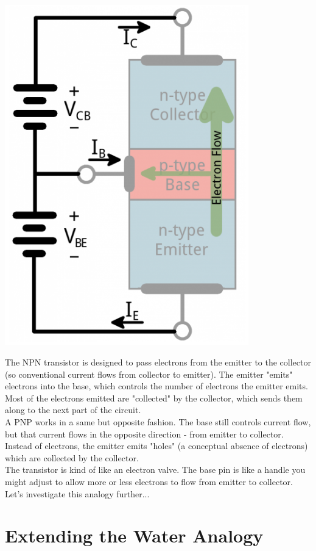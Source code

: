\documentclass[a4paper, 11pt]{article} %
\begin{document}
\begin{center}
\includegraphics[width=300pt]{tran5}
\end{center}

The NPN transistor is designed to pass electrons from the emitter to the collector (so conventional current flows from collector to emitter). The emitter "emits" electrons into the base, which controls the number of electrons the emitter emits. Most of the electrons emitted are "collected" by the collector, which sends them along to the next part of the circuit.\\

A PNP works in a same but opposite fashion. The base still controls current flow, but that current flows in the opposite direction - from emitter to collector. Instead of electrons, the emitter emits "holes" (a conceptual absence of electrons) which are collected by the collector.\\

The transistor is kind of like an electron valve. The base pin is like a handle you might adjust to allow more or less electrons to flow from emitter to collector. Let's investigate this analogy further...

\section*{Extending the Water Analogy}
\end{document}
